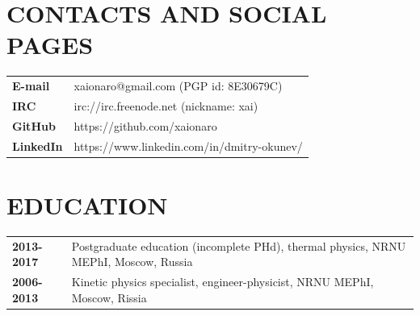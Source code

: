 \address{Dublin, Ireland}


\begin{resume}
\vspace{0.1in}

\section{CONTACTS AND SOCIAL PAGES}
\vspace{0.1in} 
\begin{tabular}{ll}
 {\bf E-mail}   & xaionaro@gmail.com (PGP id: 8E30679C)\\
 {\bf IRC}      & irc://irc.freenode.net (nickname: xai)\\
 {\bf GitHub}   & https://github.com/xaionaro\\
 {\bf LinkedIn} & https://www.linkedin.com/in/dmitry-okunev/\\
\end{tabular}

\section{EDUCATION}
\vspace{0.1in} 
\begin{tabular}{ll}
 {\bf 2013-2017} & Postgraduate education (incomplete PHd), thermal physics, NRNU MEPhI, Moscow, Russia\\
 {\bf 2006-2013} & Kinetic physics specialist, engineer-physicist, NRNU MEPhI, Moscow, Rissia\\
\end{tabular}


\end{resume}

